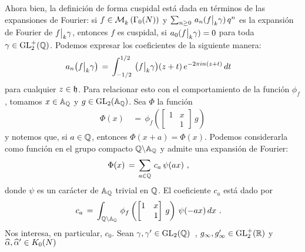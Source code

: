 Ahora bien, la definici\'{o}n de forma cuspidal est\'{a} dada en t\'{e}rminos
de las expansiones de Fourier: si $f\in\mathcal{M}^{}_{k}\left(\Gamma_{0}(N)\right)$ y
\begin{math}
	\sum_{n\geq 0}\,a_{n}(f\big|_{k}{\gamma})\,q^{n}
\end{math}
es la expansi\'{o}n de Fourier de $f\big|_{k}{\gamma}$, entonces
$f$ es cuspidal, si $a_{0}(f\big|_{k}{\gamma})=0$ para toda
$\gamma\in\mathrm{GL}^{+}_{2}(\mathbb{Q})$. Podemos expresar los coeficientes de la siguiente
manera:
\begin{align*}
	a_{n}\big(f\big|_{k}{\gamma}\big) & \,=\,\int_{-1/2}^{1/2}\,
		\big(f\big|_{k}{\gamma}\big)(z+t)\,
			e^{-2\pi i n (z+t)}\,dt
\end{align*}
%
para cualquier $z\in\mathfrak{h}$. Para relacionar esto con el comportamiento de la
funci\'{o}n $\phi_{f}$, tomamos $x\in\mathbb{A}_{\mathbb{Q}}$ y
$g\in\mathrm{GL}_{2}(\mathbb{A}_{\mathbb{Q}})$. Sea $\Phi$ la funci\'{o}n
\begin{align*}
	\Phi(x) & \,=\,\phi_{f}\left(
		\left[\begin{matrix} 1 & x \\ & 1 \end{matrix}\right]\,g\right)
\end{align*}
%
y notemos que, si $a\in\mathbb{Q}$, entonces $\Phi(x+a)=\Phi(x)$. Podemos
considerarla como funci\'{o}n en el grupo compacto
$\mathbb{Q}\backslash\mathbb{A}_{\mathbb{Q}}$ y admite una expansi\'{o}n de Fourier:
\begin{align*}
	\Phi(x) & \,=\,\sum_{a\in\mathbb{Q}}\,c_{a}\,\psi(ax)
	\text{ ,}
\end{align*}
%
donde $\psi$ es un car\'{a}cter de $\mathbb{A}_{\mathbb{Q}}$ trivial en $\mathbb{Q}$.
El coeficiente $c_{a}$ est\'{a} dado por
\begin{align*}
	c_{a} & \,=\,\int_{\mathbb{Q}\backslash\mathbb{A}_{\mathbb{Q}}}\,
		\phi_{f}\left(
			\begin{bmatrix} 1 & x \\ & 1 \end{bmatrix}\,g\right)\,
		\psi(-ax)\,dx
	\text{ .}
\end{align*}
%
Nos interesa, en particular, $c_{0}$. Sean
\begin{math}
	\gamma,\gamma'\in\mathrm{GL}_{2}(\mathbb{Q})
\end{math}~,
\begin{math}
	g_{\infty},g_{\infty}'\in\mathrm{GL}^{+}_{2}(\mathbb{R})
\end{math}
y
\begin{math}
	\widehat{\alpha},\widehat{\alpha}'\in K_{0}(N)
\end{math}
